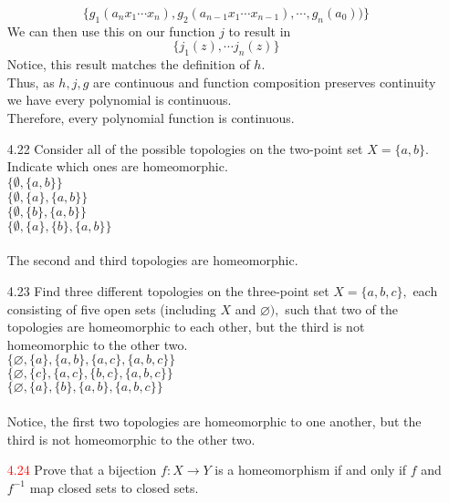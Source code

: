 \documentclass[12pt]{article}
\begin{document}
\begin{enumerate}
	\[\{g_1(a_nx_1\cdots x_n),g_2(a_{n-1}x_1\cdots x_{n-1}),\cdots ,g_n(a_0))\} \]
	We can then use this on our function $ j $ to result in
	\[\{j_1(z),\cdots j_n(z)\}\]
	Notice, this result matches the definition of $ h $.\\
	Thus, as $ h,j,g$ are continuous and function composition preserves continuity we have every polynomial is continuous.\\
	Therefore, every polynomial function is continuous.
	\item[4.22] Consider all of the possible topologies on the two-point set $X = \{ a , b \} .$ Indicate which ones are homeomorphic.\\
	$\{ \emptyset , \{ a , b \} \}$ \\
	$\{ \emptyset , \{ a \} , \{ a , b \} \}$\\
	$\{ \emptyset , \{ b \} , \{ a , b \} \}$\\
	$\{ \emptyset , \{ a \} , \{ b \} , \{ a , b \} \}$\\
	\\
	The second and third topologies are homeomorphic.
	
	\item[4.23] Find three different topologies on the three-point set $X = \{ a , b , c \} ,$ each consisting of five open sets (including $X$ and $\varnothing ) ,$ such that two of the topologies are homeomorphic to each other, but the third is not homeomorphic to the other two.\\
	$\{\varnothing, \{a\}, \{a,b\}, \{a,c\}, \{a,b,c\} \}$\\
	$\{\varnothing, \{c\}, \{a,c\}, \{b,c\}, \{a,b,c\} \}$\\
	$\{\varnothing, \{a\}, \{b\}, \{a,b\}, \{a,b,c\} \}$\\
	\\
	Notice, the first two topologies are homeomorphic to one another, but the third is not homeomorphic to the other two.
	\item[\textcolor{red}{4.24}] Prove that a bijection $f : X \rightarrow Y$ is a homeomorphism if and only if $f$ and $f ^ { - 1 }$ map closed sets to closed sets.\\
	

\end{enumerate}
\end{document}
